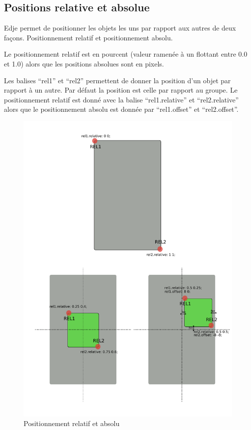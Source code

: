 \documentclass[a4paper]{efr}
\begin{document}
\subsection{Positions relative et absolue}

Edje permet de positionner les objets les uns par rapport aux autres de deux
façons. Positionnement relatif et positionnement absolu.

Le positionnement relatif est en pourcent (valeur ramenée à un flottant entre
0.0 et 1.0) alors que les positions absolues sont en pixels.

Les balises ``rel1'' et ``rel2'' permettent de donner la position d'un objet par rapport
à un autre. Par défaut la position est celle par rapport au groupe.
Le positionnement relatif est donné avec la balise ``rel1.relative'' et
``rel2.relative'' alors que le positionnement absolu est donnée par ``rel1.offset'' et
``rel2.offset''.

\begin{figure}
  \begin{center}
    \includegraphics[scale=0.7]{images/rel1rel2.pdf}
  \end{center}
  \caption{Positionnement relatif et absolu}
\end{figure}
\end{document}
